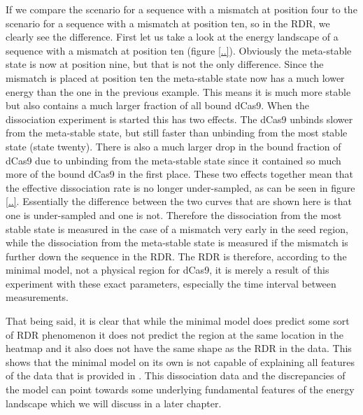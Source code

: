 If we compare the scenario for a sequence with a mismatch at position four to the scenario for a sequence with a mismatch at position ten, so in the RDR, we clearly see the difference. First let us take a look at the energy landscape of a sequence with a mismatch at position ten (figure \ref{..}). Obviously the meta-stable state is now at position nine, but that is not the only difference. Since the mismatch is placed at position ten the meta-stable state now has a much lower energy than the one in the previous example. This means it is much more stable but also contains a much larger fraction of all bound dCas9. When the dissociation experiment is started this has two effects. The dCas9 unbinds slower from the meta-stable state, but still faster than unbinding from the most stable state (state twenty). There is also a much larger drop in the bound fraction of dCas9 due to unbinding from the meta-stable state since it contained so much more of the bound dCas9 in the first place. These two effects together mean that the effective dissociation rate is no longer under-sampled, as can be seen in figure \ref{..}. Essentially the difference between the two curves that are shown here is that one is under-sampled and one is not. Therefore the dissociation from the most stable state is measured in the case of a mismatch very early in the seed region, while the dissociation from the meta-stable state is measured if the mismatch is further down the sequence in the RDR. The RDR is therefore, according to the minimal model, not a physical region for dCas9, it is merely a result of this experiment with these exact parameters, especially the time interval between measurements.


That being said, it is clear that while the minimal model does predict some sort of RDR phenomenon it does not predict the region at the same location in the heatmap and it also does not have the same shape as the RDR in the data. This shows that the minimal model on its own is not capable of explaining all features of the data that is provided in \cite{PNAS}. This dissociation data and the discrepancies of the model can point towards some underlying fundamental features of the energy landscape which we will discuss in a later chapter.





